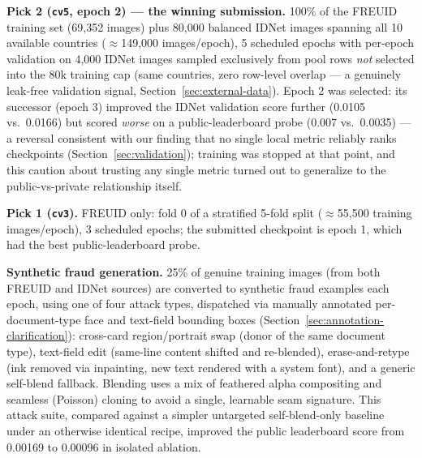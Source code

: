 \documentclass[11pt,a4paper]{article}
\begin{document}
\textbf{Pick 2 (\texttt{cv5}, epoch 2) --- the winning submission.} 100\% of
the FREUID training set (69{,}352 images) plus 80{,}000 balanced IDNet images
spanning all 10 available countries ($\approx$149{,}000 images/epoch), 5
scheduled epochs with per-epoch validation on 4{,}000 IDNet images sampled
exclusively from pool rows \emph{not} selected into the 80k training cap (same
countries, zero row-level overlap --- a genuinely leak-free validation signal,
Section~\ref{sec:external-data}). Epoch 2 was selected: its successor (epoch 3)
improved the IDNet validation score further (0.0105 vs.\ 0.0166) but scored
\emph{worse} on a public-leaderboard probe (0.007 vs.\ 0.0035) --- a reversal
consistent with our finding that no single local metric reliably ranks
checkpoints (Section~\ref{sec:validation}); training was stopped at that
point, and this caution about trusting any single metric turned out to
generalize to the public-vs-private relationship itself.

\textbf{Pick 1 (\texttt{cv3}).} FREUID only: fold 0 of a stratified 5-fold split
($\approx$55{,}500 training images/epoch), 3 scheduled epochs; the submitted
checkpoint is epoch 1, which had the best public-leaderboard probe.

\textbf{Synthetic fraud generation.} 25\% of genuine training images (from both
FREUID and IDNet sources) are converted to synthetic fraud examples each epoch,
using one of four attack types, dispatched via manually annotated per-document-type
face and text-field bounding boxes (Section~\ref{sec:annotation-clarification}):
cross-card region/portrait swap (donor of the same document type), text-field
edit (same-line content shifted and re-blended), erase-and-retype (ink removed via
inpainting, new text rendered with a system font), and a generic self-blend
fallback. Blending uses a mix of feathered alpha compositing and seamless
(Poisson) cloning to avoid a single, learnable seam signature. This attack suite,
compared against a simpler untargeted self-blend-only baseline under an otherwise
identical recipe, improved the public leaderboard score from 0.00169 to 0.00096
in isolated ablation.
\end{document}
